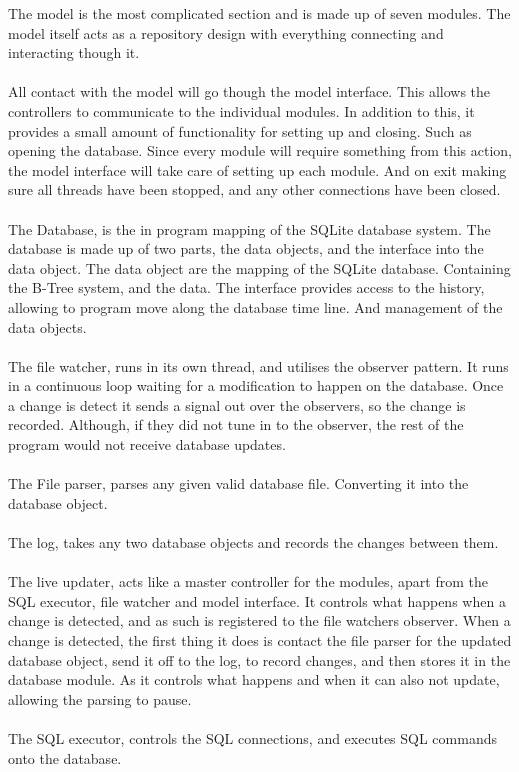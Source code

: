 The model is the most complicated section and is made up of seven modules. The model itself acts as a repository design with everything connecting and interacting though it.
\\\\
All contact with the model will go though the model interface. This allows the controllers to communicate to the individual modules. In addition to this, it provides a small amount of functionality for setting up and closing. Such as opening the database. Since every module will require something from this action, the model interface will take care of setting up each module. And on exit making sure all threads have been stopped, and any other connections have been closed.
\\\\
The Database, is the in program mapping of the SQLite database system. The database is made up of two parts, the data objects, and the interface into the data object. The data object are the mapping of the SQLite database. Containing the B-Tree system, and the data. The interface provides access to the history, allowing to program move along the database time line. And management of the data objects.
\\\\
The file watcher, runs in its own thread, and utilises the observer pattern. It runs in a continuous loop waiting for a modification to happen on the database. Once a change is detect it sends a signal out over the observers, so the change is recorded. Although, if they did not tune in to the observer, the rest of the program would not receive database updates.
\\\\
The File parser, parses any given valid database file. Converting it into the database object.
\\\\
The log, takes any two database objects and records the changes between them.
\\\\
The live updater, acts like a master controller for the modules, apart from the SQL executor, file watcher and model interface. It controls what happens when a change is detected, and as such is registered to the file watchers observer. When a change is detected, the first thing it does is contact the file parser for the updated database object, send it off to the log, to record changes, and then stores it in the database module. As it controls what happens and when it can also not update, allowing the parsing to pause.
\\\\
The SQL executor, controls the SQL connections, and executes SQL commands onto the database.